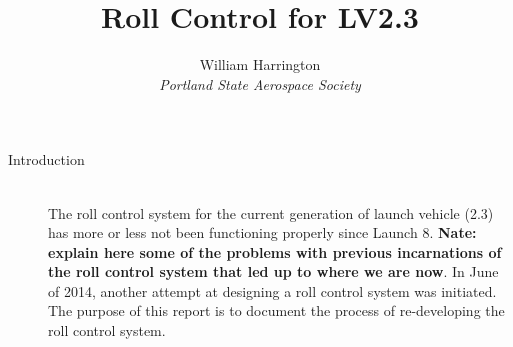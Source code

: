 \documentclass[12pt]{article}
\begin{document}
\title{Roll Control for LV2.3}
\author{William Harrington\\ %
\textit{Portland State Aerospace Society}}
 
\maketitle

\begin{description}
	\item[Introduction] \hfill \\
		The roll control system for the current generation of launch vehicle (2.3) has more or less not been functioning properly since Launch 8. \textbf{Nate: explain here some of the problems with previous incarnations of the roll control system that led up to where we are now}. In June of 2014, another attempt at designing a roll control system was initiated. The purpose of this report is to document the process of re-developing the roll control system.
		
\end{description}
\end{document}
